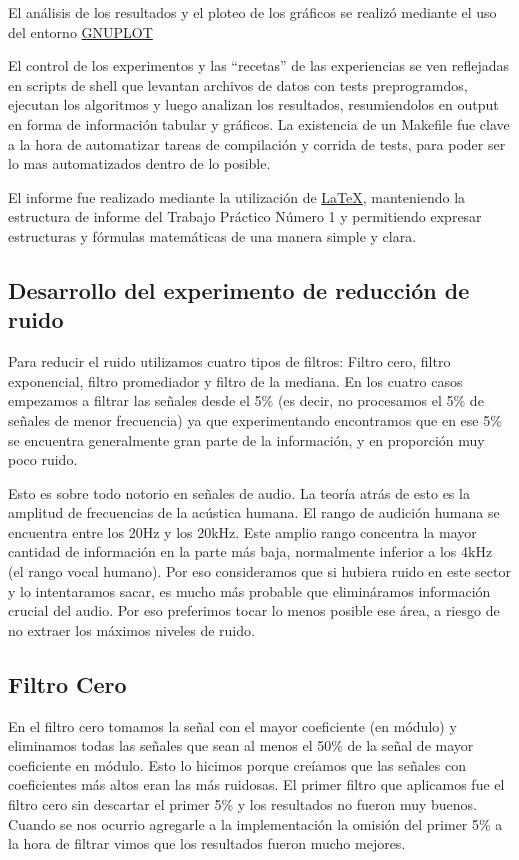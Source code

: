 El an\'alisis de los resultados y el ploteo de los gr\'aficos se realiz\'o
mediante el uso del entorno \href{http://www.gnuplot.info/}{GNUPLOT}

El control de los experimentos y las ``recetas'' de las experiencias se ven
reflejadas en scripts de shell que levantan archivos de datos con tests
preprogramdos, ejecutan los algoritmos y luego analizan los resultados,
resumiendolos en output en forma de informaci\'on tabular y gr\'aficos.
La existencia de un Makefile fue clave a la hora de automatizar tareas de
compilaci\'on y corrida de tests, para poder ser lo mas automatizados dentro de
lo posible.

El informe fue realizado mediante la utilizaci\'on de \href{http://www.latex-project.org/}{\LaTeX},
 manteniendo la estructura de informe del Trabajo Pr\'actico N\'umero 1 y
permitiendo expresar estructuras y f\'ormulas matem\'aticas de una manera simple
y clara.

\subsection{Desarrollo del experimento de reducci\'on de ruido}

Para reducir el ruido utilizamos cuatro tipos de filtros: Filtro cero, filtro 
exponencial, filtro promediador y filtro de la mediana. En los cuatro casos empezamos 
a filtrar las 
se\~nales desde el 5\% (es decir, no procesamos el 5\% de se\~nales de menor
frecuencia) ya que experimentando encontramos que en ese 5\% se encuentra 
generalmente gran parte de la informaci\'on, y en proporci\'on muy poco ruido.

Esto es sobre todo notorio en se\~nales de audio. La teor\'ia atr\'as de esto es la amplitud
de frecuencias de la ac\'ustica humana. El rango de audici\'on humana se encuentra entre los 20Hz
y los 20kHz. Este amplio rango concentra la mayor cantidad de informaci\'on en la parte m\'as baja,
normalmente inferior a los 4kHz (el rango vocal humano). Por eso consideramos que
si hubiera ruido en este sector y lo intentaramos sacar, es mucho m\'as probable que elimin\'aramos
informaci\'on crucial del audio. Por eso preferimos tocar lo menos posible ese \'area,
a riesgo de no extraer los m\'aximos niveles de ruido.

\subsection{Filtro Cero}

En el filtro cero tomamos la se\~nal con el mayor coeficiente (en m\'odulo) y 
eliminamos todas las se\~nales que sean al menos el 50\% de la se\~nal de mayor 
coeficiente en m\'odulo. Esto lo hicimos porque cre\'iamos que las se\~nales con 
coeficientes m\'as altos eran las m\'as ruidosas. El primer filtro que aplicamos 
fue el filtro cero sin descartar el primer 5\% y los resultados no fueron muy 
buenos. Cuando se nos ocurrio agregarle a la implementaci\'on la omisi\'on del 
primer 5\% a la hora de filtrar vimos que los resultados fueron mucho mejores.

